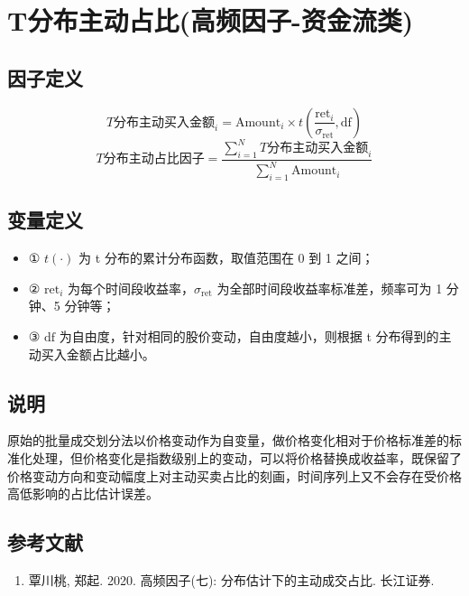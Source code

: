 \documentclass{article}
\begin{document}
\section{T分布主动占比(高频因子-资金流类)}

\subsection{因子定义}

\begin{equation}
    T \text{分布主动买入金额}_i = \mathrm{Amount}_i \times t\left(\frac{\mathrm{ret}_i}{\sigma_{\mathrm{ret}}}, \mathrm{df}\right)
\end{equation}
\begin{equation}
    T \text{分布主动占比因子} = \frac{\sum_{i=1}^{N} T \text{分布主动买入金额}_i}{\sum_{i=1}^{N} \mathrm{Amount}_i}
\end{equation}

\subsection{变量定义}
\begin{itemize}
    \item ① \( t(\cdot) \) 为 t 分布的累计分布函数，取值范围在 0 到 1 之间；
    \item ② \( \mathrm{ret}_i \) 为每个时间段收益率，\( \sigma_{\mathrm{ret}} \) 为全部时间段收益率标准差，频率可为 1 分钟、5 分钟等；
    \item ③ \( \mathrm{df} \) 为自由度，针对相同的股价变动，自由度越小，则根据 t 分布得到的主动买入金额占比越小。
\end{itemize}

\subsection{说明}
原始的批量成交划分法以价格变动作为自变量，做价格变化相对于价格标准差的标准化处理，但价格变化是指数级别上的变动，可以将价格替换成收益率，既保留了价格变动方向和变动幅度上对主动买卖占比的刻画，时间序列上又不会存在受价格高低影响的占比估计误差。

\subsection{参考文献}
\begin{enumerate}
    \item 覃川桃, 郑起. 2020. 高频因子(七): 分布估计下的主动成交占比. 长江证券.
\end{enumerate}
\end{document}
